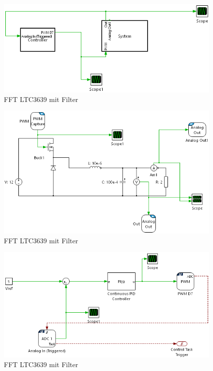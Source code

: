 \begin{figure}[H]
    \centering
    \includegraphics[width=0.8\linewidth]{Figure/Hard.png}
    \caption{FFT LTC3639 mit Filter}
    \label{fig:Hard}
\end{figure}

\begin{figure}[H]
    \centering
    \includegraphics[width=0.8\linewidth]{Figure/SystemHard.png}
    \caption{FFT LTC3639 mit Filter}
    \label{fig:ControllerHard}
\end{figure}

\begin{figure}[H]
    \centering
    \includegraphics[width=0.8\linewidth]{Figure/ControllerHard.png}
    \caption{FFT LTC3639 mit Filter}
    \label{fig:SystemHard}
\end{figure}


